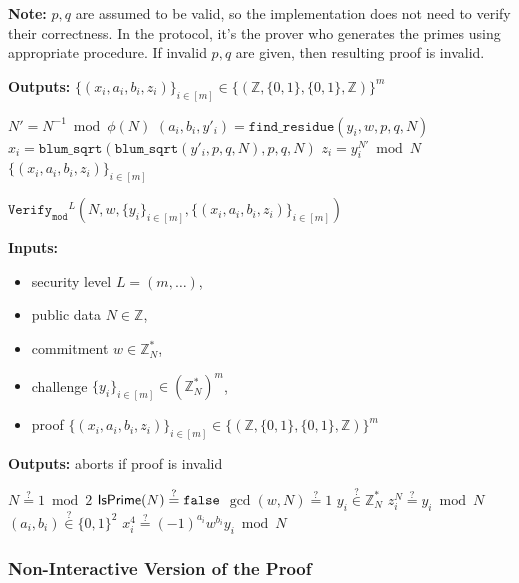 \documentclass[11pt]{article}
\newenvironment{inlineAlgorithm}{}{}
\newcommand{\algoName}[1]{#1 \par}
\newcommand{\algoInputsList}[1]{
    {\small \bf Inputs:} 
        \begin{itemize}[noitemsep,topsep=0pt]
            #1
        \end{itemize}
}
\newcommand{\algoOutputs}[1]{
    {\small \bf Outputs:} #1 \par
}
\newcommand{\fn}[1]{\ensuremath{\mathtt{#1}}}
\newcommand{\verify}[1]{\ensuremath{\mathtt{Verify}_{\mathtt{#1}}}}
\newcommand{\Z}{\mathbb{Z}}
\newcommand{\?}[1]{\stackrel{?}{#1}}
\newcommand{\Bit}{\ensuremath{\{0{,}1\}}}
\begin{document}
\begin{description}
\begin{inlineAlgorithm}
{    {\bf Note:} $p, q$ are assumed to be valid, so the implementation does not need to verify their correctness. In the protocol, it's the prover who generates the primes using appropriate procedure. If invalid $p, q$ are given, then resulting proof is invalid.
}
\algoOutputs{$\{(x_i, a_i, b_i, z_i)\}_{i\in[m]} \in \{(\Z, \Bit, \Bit, \Z)\}^m$}
\begin{algorithmic}[1]
\State $N' = N^{-1} \bmod \phi(N)$
    \State $(a_i, b_i, y'_i) = \fn{find\_residue}(y_i, w, p, q, N)$
    \State $x_i = \fn{blum\_sqrt}(\fn{blum\_sqrt}(y'_i, p, q, N), p, q, N)$
    \State $z_i = y_i^{N'} \bmod N$
\EndFor
\State \Return $\{(x_i, a_i, b_i, z_i)\}_{i \in [m]}$
\end{algorithmic}
\end{inlineAlgorithm}

\item
\begin{inlineAlgorithm}
\algoName{$\verify{mod}^L(N, w, \{y_i\}_{i\in[m]}, \{(x_i, a_i, b_i, z_i)\}_{i\in[m]})$}
\algoInputsList{
    \item security level $L = (m, \dots)$,
    \item public data $N \in \Z$,
    \item commitment $w \in \Z^*_N$,
    \item challenge $\{y_i\}_{i\in[m]} \in (\Z^*_N)^m$,
    \item proof $\{(x_i, a_i, b_i, z_i)\}_{i\in[m]} \in \{(\Z, \Bit, \Bit, \Z)\}^m$
}
\algoOutputs{aborts if proof is invalid}
\begin{algorithmic}[1]
\State $N \? = 1 \bmod 2$
\State $\isprime(N) \? = \mathtt{false}$
\State $\gcd(w, N) \? = 1$
\Statex
{}
    \State $y_i \? \in \Z^*_N$
    \State $z_i^N \? = y_i \bmod N$
    \State $(a_i, b_i) \? \in \Bit^2$
    \State $x_i^4 \? = (-1)^{a_i}w^{b_i}y_i \bmod N$
\EndFor
\end{algorithmic}
\end{inlineAlgorithm}

\end{description}

\subsubsection{Non-Interactive Version of the Proof}
\end{document}
